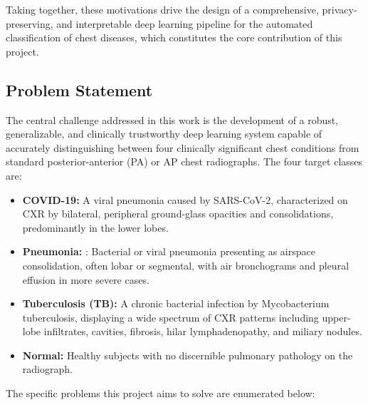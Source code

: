 Taking together, these motivations drive the design of a comprehensive, privacy-preserving, and interpretable deep learning pipeline for the automated classification of chest diseases, which constitutes the core contribution of this project.

\subsection{Problem Statement}
\label{sec:chest_challenges}
The central challenge addressed in this work is the development of a robust, generalizable, and clinically trustworthy deep learning system capable of accurately distinguishing between four clinically significant chest conditions from standard posterior-anterior (PA) or AP chest radiographs. The four target classes are:

\begin{itemize}
	\item \textbf{COVID-19:} A viral pneumonia caused by SARS-CoV-2, characterized on CXR by bilateral, peripheral ground-glass opacities and consolidations, predominantly in the lower lobes.
	\item \textbf{Pneumonia: }: Bacterial or viral pneumonia presenting as airspace consolidation, often lobar or segmental, with air bronchograms and pleural effusion in more severe cases.
	\item \textbf{Tuberculosis (TB): }A chronic bacterial infection by Mycobacterium tuberculosis, displaying a wide spectrum of CXR patterns including upper-lobe infiltrates, cavities, fibrosis, hilar lymphadenopathy, and miliary nodules.
	\item \textbf{Normal: }Healthy subjects with no discernible pulmonary pathology on the radiograph.
\end{itemize}

The specific problems this project aims to solve are enumerated below:

